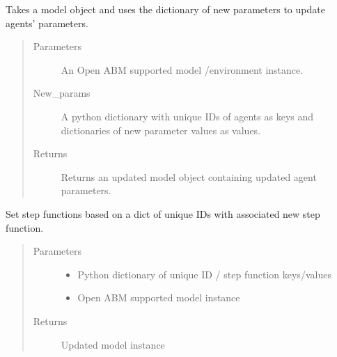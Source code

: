 \documentclass[letterpaper,10pt,english]{sphinxmanual}
\begin{document}
\begin{fulllineitems}
\label{\detokenize{index:oabm_tools.set_agent_parameters}}
Takes a model object and uses the dictionary of new parameters to update agents’ parameters.
\begin{quote}\begin{description}
\item[{Parameters}] \leavevmode
{} \textendash{} An Open ABM supported model /environment instance.

\item[{New\_params}] \leavevmode
A python dictionary with unique IDs of agents as keys and dictionaries of new parameter values as values.

\item[{Returns}] \leavevmode
Returns an updated model object containing updated agent parameters.

\end{description}\end{quote}

\end{fulllineitems}


\begin{fulllineitems}
\label{\detokenize{index:oabm_tools.set_agent_step}}
Set step functions based on a dict of unique IDs with associated new step function.
\begin{quote}\begin{description}
\item[{Parameters}] \leavevmode\begin{itemize}
\item {} 
 \textendash{} Python dictionary of unique ID / step function keys/values

\item {} 
 \textendash{} Open ABM supported model instance

\end{itemize}

\item[{Returns}] \leavevmode
Updated model instance

\end{description}\end{quote}

\end{fulllineitems}
\end{document}
